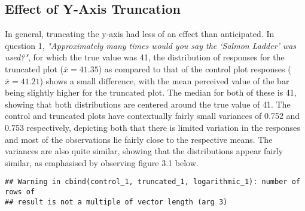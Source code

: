 \documentclass[
]{article}
\newenvironment{Shaded}{\begin{snugshade}}{\end{snugshade}}
\newcommand{\KeywordTok}[1]{\textcolor[rgb]{0.13,0.29,0.53}{\textbf{#1}}}
\newcommand{\NormalTok}[1]{#1}
\newcommand{\StringTok}[1]{\textcolor[rgb]{0.31,0.60,0.02}{#1}}
\begin{document}
\subsection{Effect of Y-Axis Truncation}

In general, truncating the y-axis had less of an effect than
anticipated. In question 1,
\textit{"Approximately many times would you say the ‘Salmon Ladder’ was used?"},
for which the true value was 41, the distribution of responses for the
truncated plot (\(\bar{x} = 41.35\)) as compared to that of the control
plot responses (\(\bar{x}=41.21\)) shows a small difference, with the
mean perceived value of the bar being slightly higher for the truncated
plot. The median for both of these is 41, showing that both
distributions are centered around the true value of 41. The control and
truncated plots have contextually fairly small variances of 0.752 and
0.753 respectively, depicting both that there is limited variation in
the responses and most of the observations lie fairly close to the
respective means. The variances are also quite similar, showing that the
distributions appear fairly similar, as emphasised by observing figure
3.1 below.

\begin{verbatim}
## Warning in cbind(control_1, truncated_1, logarithmic_1): number of rows of
## result is not a multiple of vector length (arg 3)
\end{verbatim}

\begin{Shaded}
\end{Shaded}
\end{document}
